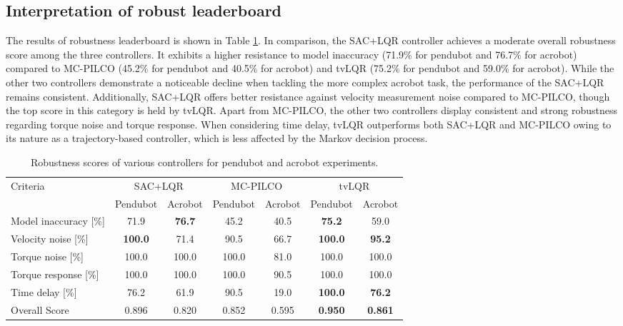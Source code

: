 \subsection{Interpretation of robust leaderboard}
The results of robustness leaderboard is shown in Table \ref{tab:robustness}. In comparison, the SAC+LQR controller achieves a moderate overall robustness score among the three controllers. It exhibits a higher resistance to model inaccuracy (71.9\% for pendubot and 76.7\% for acrobot) compared to MC-PILCO (45.2\% for pendubot and 40.5\% for acrobot) and tvLQR (75.2\% for pendubot and 59.0\% for acrobot). While the other two controllers demonstrate a noticeable decline when tackling the more complex acrobot task, the performance of the SAC+LQR remains consistent. Additionally, SAC+LQR offers better resistance against velocity measurement noise compared to MC-PILCO, though the top score in this category is held by tvLQR. Apart from MC-PILCO, the other two controllers display consistent and strong robustness regarding torque noise and torque response. When considering time delay, tvLQR outperforms both SAC+LQR and MC-PILCO owing to its nature as a trajectory-based controller, which is less affected by the Markov decision process.

\begin{table}[H]
  \centering
 \begin{tabular}{lcccccc}
 \hline
 Criteria & \multicolumn{2}{c}{SAC+LQR} & \multicolumn{2}{c}{MC-PILCO} & \multicolumn{2}{c}{tvLQR} \\
 & Pendubot & Acrobot & Pendubot & Acrobot & Pendubot & Acrobot \\
 \hline
 Model inaccuracy [\%] & 71.9 & \textbf{76.7} & 45.2 & 40.5 & \textbf{75.2} & 59.0 \\
 Velocity noise [\%] & \textbf{100.0} & 71.4 & 90.5 & 66.7 & \textbf{100.0} & \textbf{95.2} \\
 Torque noise [\%] & 100.0 & 100.0 & 100.0 & 81.0 & 100.0 & 100.0 \\
 Torque response [\%] & 100.0 & 100.0 & 100.0 & 90.5 & 100.0 & 100.0 \\
 Time delay [\%] & 76.2 & 61.9 & 90.5 & 19.0 & \textbf{100.0} & \textbf{76.2} \\
 Overall Score & 0.896 & 0.820 & 0.852 & 0.595 & \textbf{0.950} & \textbf{0.861} \\
 \hline
 \end{tabular}
 \caption{Robustness scores of various controllers for pendubot and acrobot experiments.}
 \label{tab:robustness}
\end{table}

